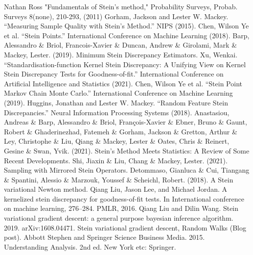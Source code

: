 \documentclass[12pt]{article}
\begin{document}
\begin{thebibliography}{20}
 Nathan Ross "Fundamentals of Stein’s method," Probability Surveys, Probab. Surveys 8(none), 210-293, (2011)
 Gorham, Jackson and Lester W. Mackey. “Measuring Sample Quality with Stein's Method.” NIPS (2015).
 Chen, Wilson Ye et al. “Stein Points.” International Conference on Machine Learning (2018).
 Barp, Alessandro \& Briol, Francois-Xavier \& Duncan, Andrew \& Girolami, Mark \& Mackey, Lester. (2019). Minimum Stein Discrepancy Estimators. 
 Xu, Wenkai. “Standardisation-function Kernel Stein Discrepancy: A Unifying View on Kernel Stein Discrepancy Tests for Goodness-of-fit.” International Conference on Artificial Intelligence and Statistics (2021).
 Chen, Wilson Ye et al. “Stein Point Markov Chain Monte Carlo.” International Conference on Machine Learning (2019).
 Huggins, Jonathan and Lester W. Mackey. “Random Feature Stein Discrepancies.” Neural Information Processing Systems (2018).
 Anastasiou, Andreas \& Barp, Alessandro \& Briol, François-Xavier \& Ebner, Bruno \& Gaunt, Robert \& Ghaderinezhad, Fatemeh \& Gorham, Jackson \& Gretton, Arthur \& Ley, Christophe \& Liu, Qiang \& Mackey, Lester \& Oates, Chris \& Reinert, Gesine \& Swan, Yvik. (2021). Stein's Method Meets Statistics: A Review of Some Recent Developments. 
 Shi, Jiaxin \& Liu, Chang \& Mackey, Lester. (2021). Sampling with Mirrored Stein Operators. 
 Detommaso, Gianluca \& Cui, Tiangang \& Spantini, Alessio \& Marzouk, Youssef \& Scheichl, Robert. (2018). A Stein variational Newton method. 
 Qiang Liu, Jason Lee, and Michael Jordan. A kernelized stein discrepancy for goodness-of-fit tests. In International conference on machine learning, 276–284. PMLR, 2016.
 Qiang Liu and Dilin Wang. Stein variational gradient descent: a general purpose bayesian inference algorithm. 2019. arXiv:1608.04471.
 Stein variational gradient descent, Random Walks (Blog post).
 Abbott Stephen and Springer Science Business Media. 2015. Understanding Analysis. 2nd ed. New York etc: Springer.
\end{thebibliography}
\end{document}

